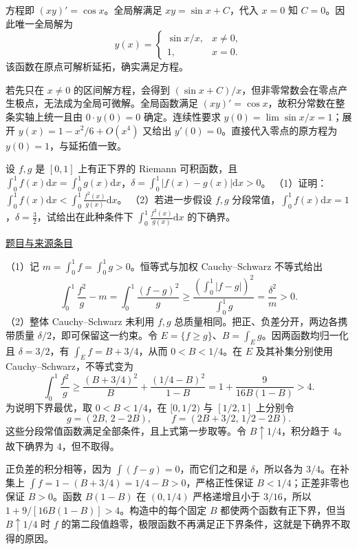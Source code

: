 \documentclass[UTF8,12pt,a4paper,fontset=fandol]{ctexart}
\begin{document}
\begin{solve}\label{ans:fin15-high:4}

方程即 $(xy)'=\cos x$。全局解满足 $xy=\sin x+C$，代入 $x=0$ 知 $C=0$。因此唯一全局解为
\[
\boxed{y(x)=\begin{cases}\sin x/x,&x\ne0,\\1,&x=0.\end{cases}}
\]
该函数在原点可解析延拓，确实满足方程。

若先只在 $x\ne0$ 的区间解方程，会得到 $(\sin x+C)/x$，但非零常数会在零点产生极点，无法成为全局可微解。全局函数满足 $(xy)'=\cos x$，故积分常数在整条实轴上统一且由 $0\cdot y(0)=0$ 确定。连续性要求 $y(0)=\lim\sin x/x=1$；展开 $y(x)=1-x^2/6+O(x^4)$ 又给出 $y'(0)=0$。直接代入零点的原方程为 $y(0)=1$，与延拓值一致。

\end{solve}

\begin{example}[来源序号7]\label{ex:fin15-high:7}\label{pr:fin15-high:7}

设 $f,g$ 是 $[0,1]$ 上有正下界的 Riemann 可积函数，且 $\int_{0}^{1}f(x)\mathrm{d}x = \int_{0}^{1}g(x)\mathrm{d}x$，$\delta = \int_{0}^{1}|f(x) - g(x)|\mathrm{d}x > 0$。
（1）证明：$\int_{0}^{1}f(x)\mathrm{d}x < \int_{0}^{1}\frac{f^{2}(x)}{g(x)}\mathrm{d}x$。
（2）若进一步假设 $f,g$ 分段常值，$\int_{0}^{1}f(x)\mathrm{d}x = 1$，$\delta = \frac{3}{2}$，试给出在此种条件下 $\int_{0}^{1}\frac{f^{2}(x)}{g(x)}\mathrm{d}x$ 的下确界。

\par\href{https://github.com/lzxcr/cmc-mathematics/blob/64916fa1fdbc3e444a652eca204d5669058ee321/src/problems/finals/15/07.md}{题目与来源条目}

\end{example}

\begin{solve}\label{ans:fin15-high:7}

（1）记 $m=\int_0^1f=\int_0^1g>0$。恒等式与加权 Cauchy--Schwarz 不等式给出
\[
\int_0^1\frac{f^2}{g}-m=\int_0^1\frac{(f-g)^2}{g}
\ge\frac{\left(\int_0^1|f-g|\right)^2}{\int_0^1g}
=\frac{\delta^2}{m}>0.
\]
（2）整体 Cauchy--Schwarz 未利用 $f,g$ 总质量相同。把正、负差分开，两边各携带质量 $\delta/2$，即可保留这一约束。令 $E=\{f\ge g\}$、$B=\int_Eg$。因两函数均归一化且 $\delta=3/2$，有 $\int_Ef=B+3/4$，从而 $0<B<1/4$。在 $E$ 及其补集分别使用 Cauchy--Schwarz，不等式变为
\[
\int_0^1\frac{f^2}{g}
\ge\frac{(B+3/4)^2}{B}+\frac{(1/4-B)^2}{1-B}
=1+\frac9{16B(1-B)}>4.
\]
为说明下界最优，取 $0<B<1/4$，在 $[0,1/2)$ 与 $[1/2,1]$ 上分别令
\[
g=(2B,\,2-2B),\qquad f=(2B+3/2,\,1/2-2B).
\]
这些分段常值函数满足全部条件，且上式第一步取等。令 $B\uparrow1/4$，积分趋于 $4$。故下确界为 $\boxed4$，但不取得。

正负差的积分相等，因为 $\int(f-g)=0$，而它们之和是 $\delta$，所以各为 $3/4$。在补集上 $\int f=1-(B+3/4)=1/4-B>0$，严格正性保证 $B<1/4$；正差非零也保证 $B>0$。函数 $B(1-B)$ 在 $(0,1/4)$ 严格递增且小于 $3/16$，所以 $1+9/[16B(1-B)]>4$。构造中的每个固定 $B$ 都使两个函数有正下界，但当 $B\uparrow1/4$ 时 $f$ 的第二段值趋零，极限函数不再满足正下界条件，这就是下确界不取得的原因。

\end{solve}
\end{document}
